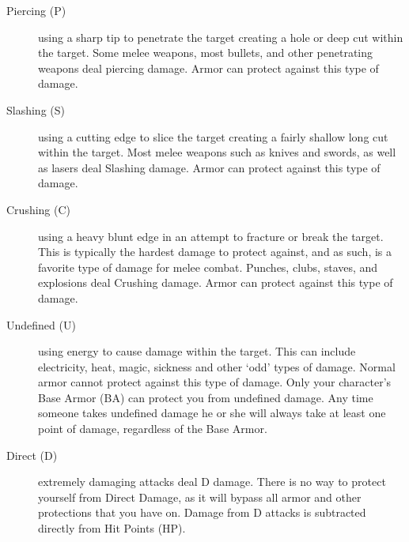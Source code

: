 \documentclass[twoside]{book}
\begin{document}
\begin{description}
    
  \item[ Piercing (P) ] 
    {  
      using a sharp tip to penetrate the target
                   creating a hole or deep cut within the target. Some
                   melee weapons, most bullets, and other penetrating
                   weapons deal piercing damage. Armor can protect
                   against this type of damage. 
    }
  
  \item[ Slashing (S) ] 
    {  
      using a cutting edge to slice the target
                   creating a fairly shallow long cut within the target.
                   Most melee weapons such as knives and swords, as well
                   as lasers deal Slashing damage. Armor can protect
                   against this type of damage. 
    }
  
  \item[ Crushing (C) ] 
    {  
      using a heavy blunt edge in an attempt to
                   fracture or break the target. This is typically the
                   hardest damage to protect against, and as such, is a
                   favorite type of damage for melee combat. Punches,
                   clubs, staves, and explosions deal Crushing damage.
                   Armor can protect against this type of damage. 
    }
  
  \item[ Undefined (U) ] 
    {  
      using energy to cause damage within the target.
                   This can include electricity, heat, magic, sickness
                   and other `odd' types of damage. Normal
                   armor cannot protect against this type of damage. Only
                   your character's Base Armor (BA) can protect you
                   from undefined damage. Any time someone takes
                   undefined damage he or she will always take at least
                   one point of damage, regardless of the Base Armor.
                   
    }
  
  \item[ Direct (D) ] 
    {  
      extremely damaging attacks deal D damage. There
                   is no way to protect yourself from Direct Damage, as
                   it will bypass all armor and other protections that
                   you have on. Damage from D attacks is subtracted
                   directly from Hit Points (HP). 
    }
  
\end{description}
  
\end{document}
